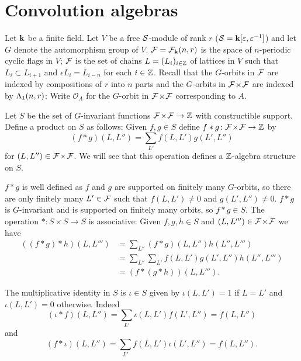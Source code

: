 \documentclass[a4paper, 11pt]{report}
\begin{document}
\section{Convolution algebras}

Let $\mathbf{k}$ be a finite field. Let $V$ be a free $\mathcal{S}$-module of rank $r$ ($\mathcal{S} =\mathbf{k}[\varepsilon,\varepsilon^{-1}]$) and let $G$ denote the automorphism group of $V$. $\mathcal{F}=\mathcal{F}_{\mathbf{k}}(n,r)$ is the space of $n$-periodic cyclic flags in $V$; $\mathcal{F}$ is the set of chains $L=(L_i)_{i\in\mathbb{Z}}$ of lattices in $V$ such that $L_i\subset L_{i+1}$ and $\epsilon L_i = L_{i-n}$ for each $i\in\mathbb{Z}$. Recall that the $G$-orbits in $\mathcal{F}$ are indexed by compositions of $r$ into $n$ parts and the $G$-orbits in ${\mathcal{F}\!\times\!\mathcal{F}}$ are indexed by $\Lambda_1(n,r)$: Write $\mathcal{O}_A$ for the $G$-orbit in ${\mathcal{F}\!\times\!\mathcal{F}}$ corresponding to $A$.

Let $S$ be the set of $G$-invariant functions ${\mathcal{F}\!\times\!\mathcal{F}}\to\mathbb{Z}$ with constructible support. Define a product on $S$ as follows: Given $f,g\in S$ define $f\ast g\colon{\mathcal{F}\!\times\!\mathcal{F}}\to\mathbb{Z}$ by
\begin{equation*}
(f\ast g)(L,L'') = \sum_{L'} f(L,L')g(L',L'')
\end{equation*}
for $(L,L'')\in{\mathcal{F}\!\times\!\mathcal{F}}$. We will see that this operation defines a $\mathbb{Z}$-algebra structure on $S$.

$f\ast g$ is well defined as $f$ and $g$ are supported on finitely many $G$-orbits, so there are only finitely many $L'\in\mathcal{F}$ such that $f(L,L')\neq 0$ and $g(L',L'')\neq 0$. $f\ast g$ is $G$-invariant and is supported on finitely many orbits, so $f\ast g\in S$. The operation $\ast:S\times S\to S$ is associative: Given $f,g,h\in S$ and $(L,L''')\in{\mathcal{F}\!\times\!\mathcal{F}}$ we have
\begin{align*}
((f\ast g)\ast h)(L,L''')
&= \sum_{L''} (f\ast g)(L,L'')h(L'',L''')\\
&= \sum_{L''}\sum_{L'} f(L,L')g(L',L'')h(L'',L''')\\
&= (f\ast (g\ast h))(L,L''').
\end{align*}

The multiplicative identity in $S$ is $\iota\in S$ given by $\iota(L,L') = 1$ if $L=L'$ and $\iota(L,L')=0$ otherwise. Indeed
\begin{equation*}
(\iota\ast f)(L,L'') = \sum_{L'}\iota(L,L')f(L',L'') = f(L,L'')
\end{equation*}
and
\begin{equation*}
(f\ast\iota)(L,L'') = \sum_{L'}f(L,L')\iota(L',L'') = f(L,L'').
\end{equation*}
\end{document}
